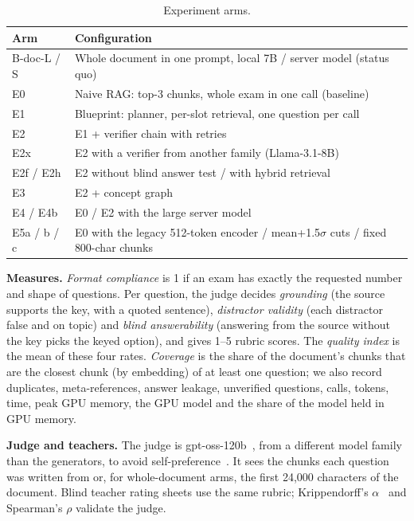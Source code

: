 \documentclass[conference]{IEEEtran}
\begin{document}
\begin{table}[t]
\centering
\caption{Experiment arms.}
\label{tab:arms}
\footnotesize
\setlength{\tabcolsep}{3pt}
\begin{tabular}{@{}l>{\raggedright\arraybackslash}p{6.5cm}@{}}
\toprule
Arm & Configuration \\
\midrule
B-doc-L / S & Whole document in one prompt, local 7B / server model (status quo) \\
E0 & Naive RAG: top-3 chunks, whole exam in one call (baseline) \\
E1 & Blueprint: planner, per-slot retrieval, one question per call \\
E2 & E1 + verifier chain with retries \\
E2x & E2 with a verifier from another family (Llama-3.1-8B) \\
E2f / E2h & E2 without blind answer test / with hybrid retrieval \\
E3 & E2 + concept graph \\
E4 / E4b & E0 / E2 with the large server model \\
E5a / b / c & E0 with the legacy 512-token encoder / mean+1.5$\sigma$ cuts / fixed 800-char chunks \\
\bottomrule
\end{tabular}
\end{table}

\textbf{Measures.} \emph{Format compliance} is 1 if an exam has exactly the requested number and shape
of questions. Per question, the judge decides \emph{grounding} (the source supports the key, with a
quoted sentence), \emph{distractor validity} (each distractor false and on topic) and \emph{blind
answerability} (answering from the source without the key picks the keyed option), and gives 1--5
rubric scores. The \emph{quality index} is the mean of these four rates. \emph{Coverage} is the share
of the document's chunks that are the closest chunk (by embedding) of at least one question; we also record duplicates,
meta-references, answer leakage, unverified questions, calls, tokens, time, peak GPU memory, the GPU
model and the share of the model held in GPU memory.

\textbf{Judge and teachers.} The judge is gpt-oss-120b~\cite{gptoss2025}, from a different model family
than the generators, to avoid self-preference~\cite{panickssery2024selfpref}. It sees the chunks each
question was written from or, for whole-document arms, the first 24{,}000 characters of the document. Blind teacher rating
sheets use the same rubric; Krippendorff's $\alpha$~\cite{krippendorff2004} and Spearman's $\rho$
validate the judge.
\end{document}
